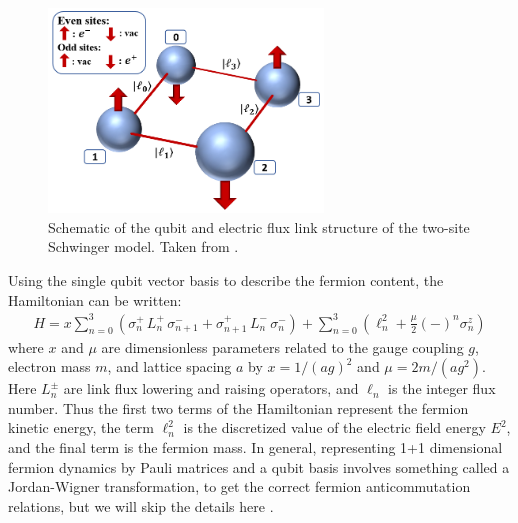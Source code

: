 \documentclass[a4paper,11pt]{article}
\begin{document}
%
\begin{figure}[tb]
\centering
\includegraphics[width=0.65\textwidth]{figs/Schematic.PNG}
\caption{Schematic of the qubit and electric flux link structure of the two-site Schwinger model.
Taken from \cite{Klco:2018kyo}.  \label{fig:Schwinger}}
\end{figure}
%

Using the single qubit vector basis to describe the fermion content, the Hamiltonian can be written:
\begin{eqnarray}
H = x \sum_{n=0}^{3} \left( \sigma^+_n \, L^+_n \, \sigma^-_{n+1} + \sigma^+_{n+1} \, L^-_n \, \sigma^-_n \right)
+ \sum_{n=0}^{3} \left( \ell_n^2 + \frac{\mu}{2} (-)^n \sigma^z_n \right)
\label{eq:HSchwinger}
\end{eqnarray}
where $x$ and $\mu$ are dimensionless parameters related to the gauge coupling $g$, electron mass $m$, and lattice spacing $a$ by
$x = 1/(ag)^2$ and $\mu = 2m/(ag^2)$. Here $L^\pm_n$ are link flux lowering and raising operators, and $\ell_n$ is the integer flux number.
Thus the first two terms of the Hamiltonian represent the fermion kinetic energy, the term $\ell_n^2$ is the discretized value of the electric field
energy $E^2$, and the final term is the fermion mass. In general, representing 1+1 dimensional fermion dynamics by Pauli matrices and a qubit basis involves something
called a Jordan-Wigner transformation, to get the correct fermion anticommutation relations, but we will skip the details here \cite{Sachdev}.
\end{document}
